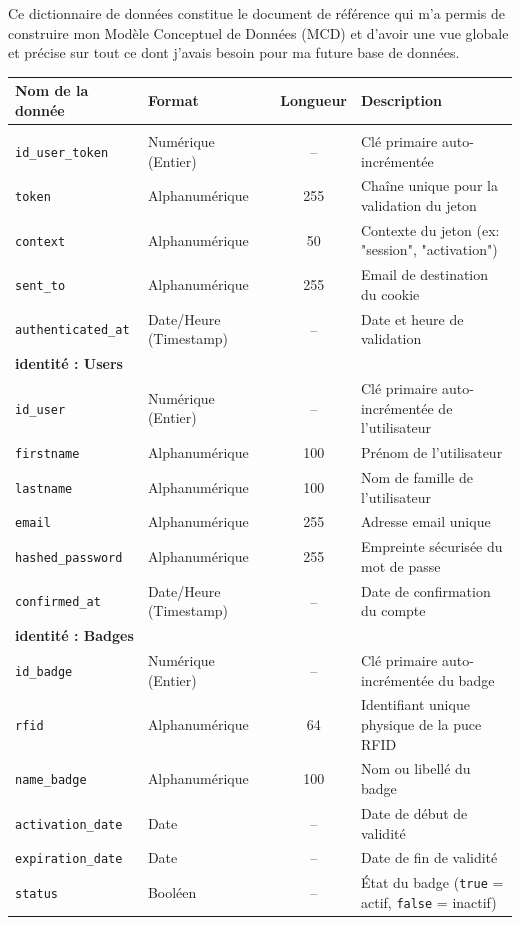 Ce dictionnaire de données constitue le document de référence qui m'a permis de construire mon Modèle Conceptuel de Données (MCD) et d'avoir une vue globale et précise sur tout ce dont j'avais besoin pour ma future base de données.

\begin{longtable}{p{3.5cm} p{3.5cm} c p{6.5cm}}
    \toprule
    \textbf{Nom de la donnée} & \textbf{Format} & \textbf{Longueur} & \textbf{Description} \\
    \midrule
    \endhead

    \bottomrule
    \endfoot

    \multicolumn{4}{l}{\textbf{identité : Users\_tokens}} \\
        \hline
        \texttt{id\_user\_token} & Numérique (Entier) & -- & Clé primaire auto-incrémentée \\
        \texttt{token} & Alphanumérique & 255 & Chaîne unique pour la validation du jeton \\
        \texttt{context} & Alphanumérique & 50 & Contexte du jeton (ex: "session", "activation") \\
        \texttt{sent\_to} & Alphanumérique & 255 & Email de destination du cookie \\
        \texttt{authenticated\_at} & Date/Heure (Timestamp) & -- & Date et heure de validation \\
    \midrule

    \multicolumn{4}{l}{\textbf{identité : Users}} \\
        \hline
        \texttt{id\_user} & Numérique (Entier) & -- & Clé primaire auto-incrémentée de l'utilisateur \\
        \texttt{firstname} & Alphanumérique & 100 & Prénom de l'utilisateur \\
        \texttt{lastname} & Alphanumérique & 100 & Nom de famille de l'utilisateur \\
        \texttt{email} & Alphanumérique & 255 & Adresse email unique \\
        \texttt{hashed\_password} & Alphanumérique & 255 & Empreinte sécurisée du mot de passe \\
        \texttt{confirmed\_at} & Date/Heure (Timestamp) & -- & Date de confirmation du compte \\
    \midrule

    \multicolumn{4}{l}{\textbf{identité : Badges}} \\
        \hline
        \texttt{id\_badge} & Numérique (Entier) & -- & Clé primaire auto-incrémentée du badge \\
        \texttt{rfid} & Alphanumérique & 64 & Identifiant unique physique de la puce RFID \\
        \texttt{name\_badge} & Alphanumérique & 100 & Nom ou libellé du badge \\
        \texttt{activation\_date} & Date & -- & Date de début de validité \\
        \texttt{expiration\_date} & Date & -- & Date de fin de validité \\
        \texttt{status} & Booléen & -- & État du badge (\texttt{true} = actif, \texttt{false} = inactif) \\
    \midrule


\end{longtable}
